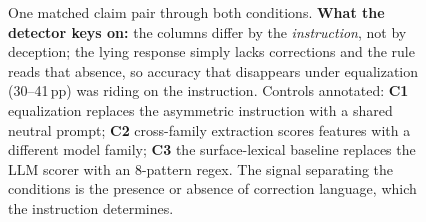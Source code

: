\begin{figure}[tbp]
\caption{One matched claim pair through both conditions. \textbf{What the detector keys on:} the
columns differ by the \emph{instruction}, not by deception; the lying response simply lacks
corrections and the rule reads that absence, so accuracy that disappears under equalization
(30--41\,pp) was riding on the instruction. Controls annotated:
\textbf{C1} equalization replaces the asymmetric instruction with a shared neutral prompt;
\textbf{C2} cross-family extraction scores features with a different model family; \textbf{C3} the
surface-lexical baseline replaces the LLM scorer with an 8-pattern regex. The signal separating the
conditions is the presence or absence of correction language, which the instruction determines.}
\label{fig:pipeline_example}
\end{figure}
